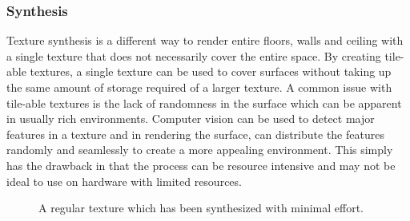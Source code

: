 \documentclass[12pt]{article}
\begin{document}
\subsubsection{Synthesis}
Texture synthesis is a different way to render entire floors, walls and ceiling with a single texture that does not necessarily cover the entire space. By creating tile-able textures, a single texture can be used to cover surfaces without taking up the same amount of storage required of a larger texture. A common issue with tile-able textures is the lack of randomness in the surface which can be apparent in usually rich environments. Computer vision can be used to detect major features in a texture and in rendering the surface, can distribute the features randomly and seamlessly to create a more appealing environment. This simply has the drawback in that the process can be resource intensive and may not be ideal to use on hardware with limited resources. \citep{Efros}
\begin{figure}[!htbp]
   \begin{center}
   \caption{A regular texture which has been synthesized with minimal effort.}
   \end{center}
\end{figure}
\end{document}
